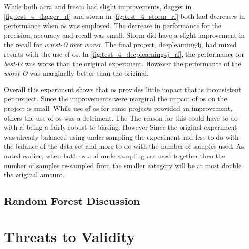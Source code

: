 While both acra and fresco had slight improvements, dagger in \autoref{fig:test_4_dagger_rf} and storm in \autoref{fig:test_4_storm_rf} both had decreases in performance when \gls{os} was employed. The decrease in performance for the precision, accuracy and recall was small. Storm did have a slight improvement in the recall for \textit{worst-O} over \textit{worst}. The final project, deeplearning4j, had mixed results with the use of \gls{os}. In \autoref{fig:test_4_deeplearning4j_rf}, the performance for \textit{best-O} was worse than the original experiment. However the performance of the \textit{worst-O} was marginally better than the original.

Overall this experiment shows that \gls{os} provides little impact that is inconsistent per project. Since the improvements were marginal the impact of \gls{os} on the project is small. While use of \gls{os} for some projects provided an improvement, others the use of \gls{os} was a detriment. The The reason for this could have to do with \gls{rf} being a fairly robust to biasing. However Since the original experiment was already balanced using under sampling the experiment had less to do with the balance of the data set and more to do with the number of samples used. As noted earlier, when both \gls{os} and undersampling are used together then the number of samples re-sampled from the smaller category will be at most double the original amount. 

\subsection{Random Forest Discussion}
\label{subsec:rf_discussion}


\section{Threats to Validity}
\label{sec:threat_validity}















